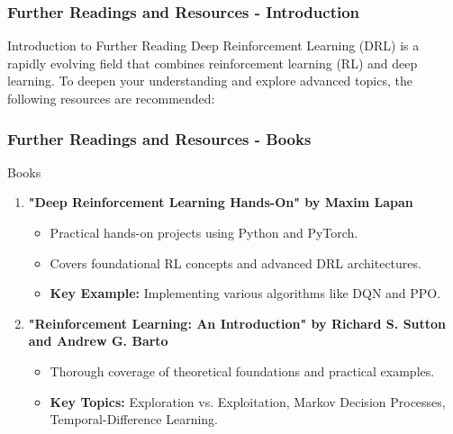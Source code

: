 \documentclass[aspectratio=169]{beamer}
\begin{document}
\begin{frame}[fragile]
  \frametitle{Further Readings and Resources - Introduction}
  \begin{block}{Introduction to Further Reading}
    Deep Reinforcement Learning (DRL) is a rapidly evolving field that combines reinforcement learning (RL) and deep learning. 
    To deepen your understanding and explore advanced topics, the following resources are recommended:
  \end{block}
\end{frame}

\begin{frame}[fragile]
  \frametitle{Further Readings and Resources - Books}
  \begin{block}{Books}
    \begin{enumerate}
      \item \textbf{"Deep Reinforcement Learning Hands-On" by Maxim Lapan}
        \begin{itemize}
          \item Practical hands-on projects using Python and PyTorch.
          \item Covers foundational RL concepts and advanced DRL architectures.
          \item \textbf{Key Example:} Implementing various algorithms like DQN and PPO.
        \end{itemize}
        
      \item \textbf{"Reinforcement Learning: An Introduction" by Richard S. Sutton and Andrew G. Barto}
        \begin{itemize}
          \item Thorough coverage of theoretical foundations and practical examples.
          \item \textbf{Key Topics:} Exploration vs. Exploitation, Markov Decision Processes, Temporal-Difference Learning.
        \end{itemize}
    \end{enumerate}
  \end{block}
\end{frame}
\end{document}
